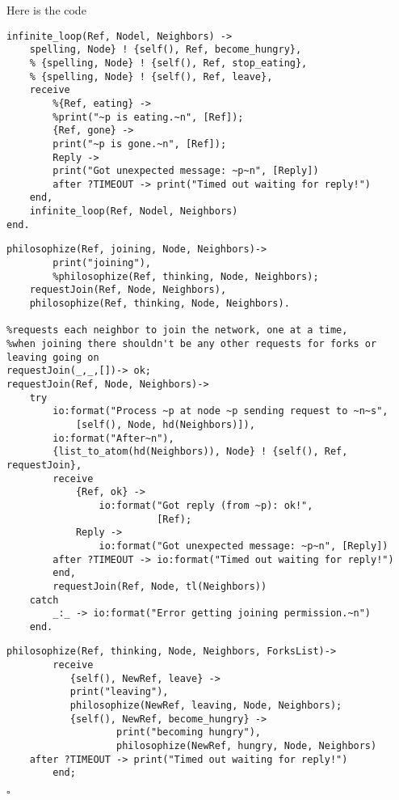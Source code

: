 \documentclass[11pt]{article}
\newenvironment{solution}{\noindent{\bf Solution.} }{

\hfill$\square$}
\begin{document}
\begin{solution}

\item Here is the code
\begin{lstlisting}
infinite_loop(Ref, Nodel, Neighbors) ->
    spelling, Node} ! {self(), Ref, become_hungry},
    % {spelling, Node} ! {self(), Ref, stop_eating},
    % {spelling, Node} ! {self(), Ref, leave},
    receive
        %{Ref, eating} ->          
        %print("~p is eating.~n", [Ref]);
        {Ref, gone} ->
        print("~p is gone.~n", [Ref]);
        Reply ->
        print("Got unexpected message: ~p~n", [Reply])
        after ?TIMEOUT -> print("Timed out waiting for reply!")
    end,
    infinite_loop(Ref, Nodel, Neighbors)
end.
\end{lstlisting}

\begin{lstlisting}
philosophize(Ref, joining, Node, Neighbors)->
        print("joining"),
        %philosophize(Ref, thinking, Node, Neighbors);
    requestJoin(Ref, Node, Neighbors),
    philosophize(Ref, thinking, Node, Neighbors).
    
%requests each neighbor to join the network, one at a time,
%when joining there shouldn't be any other requests for forks or leaving going on
requestJoin(_,_,[])-> ok;
requestJoin(Ref, Node, Neighbors)->
    try
        io:format("Process ~p at node ~p sending request to ~n~s",
            [self(), Node, hd(Neighbors)]),
        io:format("After~n"),
        {list_to_atom(hd(Neighbors)), Node} ! {self(), Ref, requestJoin},
        receive
            {Ref, ok} ->
                io:format("Got reply (from ~p): ok!",
                          [Ref);
            Reply ->
                io:format("Got unexpected message: ~p~n", [Reply])
        after ?TIMEOUT -> io:format("Timed out waiting for reply!")
        end,
        requestJoin(Ref, Node, tl(Neighbors))
    catch
        _:_ -> io:format("Error getting joining permission.~n")
    end.
\end{lstlisting}

\begin{lstlisting}
philosophize(Ref, thinking, Node, Neighbors, ForksList)->
        receive
           {self(), NewRef, leave} ->
           print("leaving"),
           philosophize(NewRef, leaving, Node, Neighbors);
           {self(), NewRef, become_hungry} ->
                   print("becoming hungry"),
                   philosophize(NewRef, hungry, Node, Neighbors)
	after ?TIMEOUT -> print("Timed out waiting for reply!")
        end;
\end{lstlisting}


\end{solution}
\end{document}
